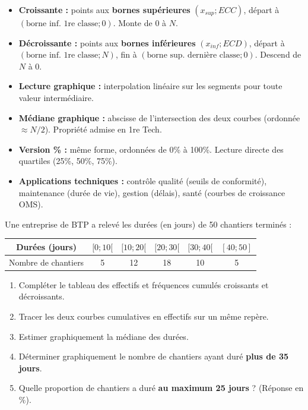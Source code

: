 \documentclass[11pt]{article}
\begin{document}
\begin{aretenir}
\begin{itemize}
\item \textbf{Croissante :} points aux \textbf{bornes supérieures} $(x_{sup}; ECC)$, départ à $(\text{borne inf. 1re classe}; 0)$. Monte de 0 à $N$.
\item \textbf{Décroissante :} points aux \textbf{bornes inférieures} $(x_{inf}; ECD)$, départ à $(\text{borne inf. 1re classe}; N)$, fin à $(\text{borne sup. dernière classe}; 0)$. Descend de $N$ à 0.
\item \textbf{Lecture graphique :} interpolation linéaire sur les segments pour toute valeur intermédiaire.
\item \textbf{Médiane graphique :} abscisse de l'intersection des deux courbes (ordonnée $\approx N/2$). Propriété admise en 1re Tech.
\item \textbf{Version \% :} même forme, ordonnées de 0\% à 100\%. Lecture directe des quartiles (25\%, 50\%, 75\%).
\item \textbf{Applications techniques :} contrôle qualité (seuils de conformité), maintenance (durée de vie), gestion (délais), santé (courbes de croissance OMS).
\end{itemize}
\end{aretenir}

\begin{exercice}
Une entreprise de BTP a relevé les durées (en jours) de 50 chantiers terminés :
\begin{center}
\begin{tabular}{|c|c|c|c|c|c|}\hline
Durées (jours) & $[0;10[$ & $[10;20[$ & $[20;30[$ & $[30;40[$ & $[40;50]$ \\ \hline
Nombre de chantiers & 5 & 12 & 18 & 10 & 5 \\ \hline
\end{tabular}
\end{center}
\begin{enumerate}
\item Compléter le tableau des effectifs et fréquences cumulés croissants et décroissants.
\item Tracer les deux courbes cumulatives en effectifs sur un même repère.
\item Estimer graphiquement la médiane des durées.
\item Déterminer graphiquement le nombre de chantiers ayant duré \textbf{plus de 35 jours}.
\item Quelle proportion de chantiers a duré \textbf{au maximum 25 jours} ? (Réponse en $\%$).
\end{enumerate}
\end{exercice}
\end{document}
